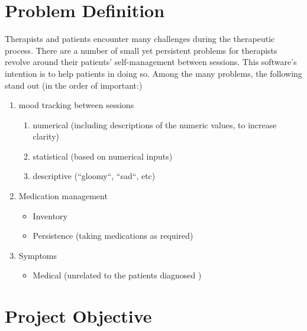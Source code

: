 \documentclass[11pt]{article}
\begin{document}
    \maketitle

    \pagebreak

    \tableofcontents

    \pagebreak


    \section{Problem Definition}\label{sec:problem-definition}
    Therapists and patients encounter many challenges during the therapeutic process.
    There are a number of small yet persistent problems for therapists revolve around their patients' self-management between sessions.
    This software's intention is to help patients in doing so.
    Among the many problems, the following stand out (in the order of important:)
    \begin{enumerate}
        \item mood tracking between sessions
        \begin{enumerate}
            \item numerical (including descriptions of the numeric values, to increase clarity)
            \item statistical (based on numerical inputs)
            \item descriptive (``gloomy``, ``sad``, etc)
        \end{enumerate}
        \item Medication management
        \begin{itemize}
            \item Inventory
            \item Persistence (taking medications as required)
        \end{itemize}
        \item Symptoms
        \begin{itemize}
            \item Medical (unrelated to the patients diagnosed )
        \end{itemize}
    \end{enumerate}


    \section{Project Objective}\label{sec:project-objective}
\end{document}
